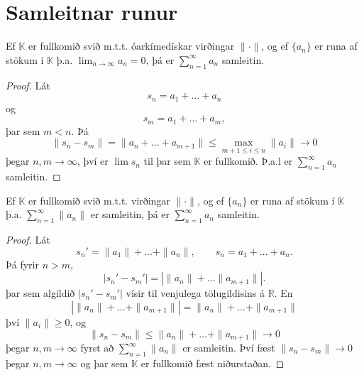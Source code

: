 \section*{Samleitnar runur}
\begin{setn}
Ef $\mathbb{K}$ er fullkomið svið m.t.t. óarkímedískar virðingar $\| \cdot  \|$, og ef $\{ a_n \} $ er 
runa af stökum í $\mathbb{K}$ þ.a. $\lim_{n \rightarrow \infty} a_n = 0$, þá er $\sum_{n=1}^\infty a_n$ samleitin.
\end{setn}
\begin{proof}
Lát 
\begin{equation*}
s_n = a_1+ \ldots + a_n
\end{equation*}
og
\begin{equation*}
s_m = a_1 + \ldots + a_m,
\end{equation*}
þar sem $m < n$. Þá
\begin{equation*}
\|s_n - s_m \| = \| a_n + \ldots + a_{m+1} \| \leq \max_{m+1 \leq i \leq n} \|a_i\| \rightarrow 0
\end{equation*}
þegar $n,m \rightarrow \infty$, því er $\lim s_n$ til þar sem $\mathbb{K}$ er fullkomið. Þ.a.l er $\sum_{n=1}^\infty a_n$ samleitin.
\end{proof}

\begin{setn}
Ef $\mathbb{K}$ er fullkomið svið m.t.t. virðingar $\| \cdot \|$, og ef $\{ a_n \}$ er runa af stökum í $\mathbb{K}$ 
þ.a. $\sum_{n=1}^{\infty} \| a_n \| $ er samleitin, þá er $\sum_{n=1}^\infty a_n $ samleitin. 
\end{setn}
\begin{proof}
Lát 
\begin{equation*}
 s_n' = \| a_1 \| + \ldots + \|a_n\|, \qquad s_n = a_1 + \ldots + a_n.
\end{equation*}
Þá fyrir $n>m$, 
\begin{equation*}
|s_n'- s_m' | = | \| a_n \| + \ldots \|a_{m+1}\| |.
\end{equation*}
þar sem algildið $| s_n' - s_m' | $ vísir til venjulega  tölugildisins á $\mathbb{R}$. En 
\begin{equation*}
| \| a_n \| + \ldots + \| a_{m+1} \| | = \| a_n \| + \ldots + \| a_{m+1} \|
\end{equation*}
því $\| a_i \| \geq 0$, og 
\begin{equation}
\| s_n - s_m \| \leq \|a_n\| + \ldots + \|a_{m+1}\| \rightarrow 0
\end{equation}
þegar $n,m \rightarrow \infty$ fyrst að $\sum_{n=1}^\infty \|a_n\|$ er samleitin. 
Því fæst $\|s_n - s_m \| \rightarrow 0$ þegar $n,m \rightarrow \infty $ og þar sem $\mathbb{K}$ er fullkomið fæst niðurstaðan.  
\end{proof}

